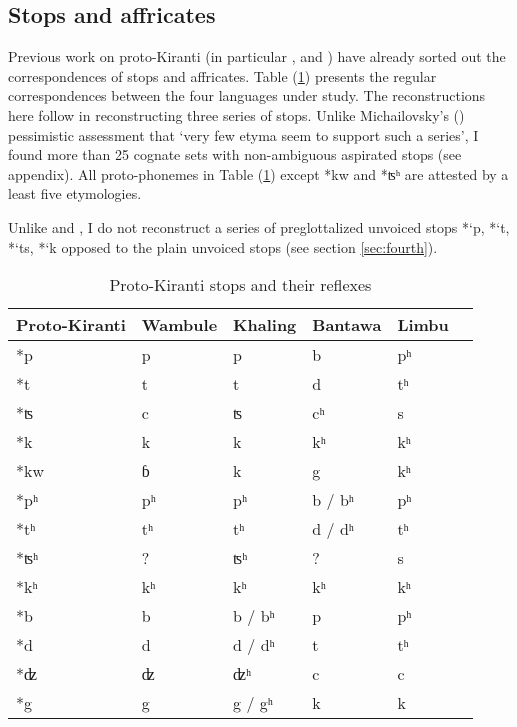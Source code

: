 \documentclass[oldfontcommands,oneside,a4paper,11pt]{article}
\newcommand{\ipa}[1]{{\phon\mbox{#1}}} %
\begin{document}
\subsection{Stops and affricates} \label{sec:stops}

Previous work on proto-Kiranti (in particular \citealt{starostin94kiranti}, \citealt{michailovsky94stops} and \citealt{opgenort05jero}) have already sorted out the correspondences of stops and affricates. Table (\ref{tab:stops}) presents the regular correspondences between the four languages under study. The reconstructions here follow \citet{michailovsky94stops} in reconstructing three series of stops. Unlike Michailovsky's (\citeyear{michailovsky10kiranti}) pessimistic assessment that `very  few etyma seem to support such a series', I found more than 25 cognate sets with non-ambiguous aspirated stops (see appendix). All proto-phonemes in Table (\ref{tab:stops}) except *\ipa{kw} and *\ipa{ʦʰ} are attested by a least five etymologies.

Unlike \citet{starostin94kiranti} and \citet{opgenort05jero}, I do not reconstruct a series of preglottalized unvoiced stops *\ipa{`p},  *\ipa{`t},  *\ipa{`ts},  *\ipa{`k} opposed to the plain unvoiced stops (see section \ref{sec:fourth}). 


\begin{table}[H]
\caption{Proto-Kiranti stops and their reflexes} \centering \label{tab:stops}
\begin{tabular}{llllll}
\toprule
Proto-Kiranti & Wambule & Khaling & Bantawa & Limbu \\
\midrule
\ipa{*p} & \ipa{p} & \ipa{p} & \ipa{b} & \ipa{pʰ}  \\
\ipa{*t} & \ipa{t} & \ipa{t} & \ipa{d} & \ipa{tʰ}  \\
\ipa{*ʦ} & \ipa{c} & \ipa{ʦ} & \ipa{cʰ} & \ipa{s}  \\
\ipa{*k} & \ipa{k} & \ipa{k} & \ipa{kʰ} & \ipa{kʰ}  \\
\midrule
\ipa{*kw} & \ipa{ɓ} & \ipa{k} & \ipa{g} & \ipa{kʰ}  \\
\midrule
\ipa{*pʰ} & \ipa{pʰ} & \ipa{pʰ} & \ipa{b} / \ipa{bʰ}  & \ipa{pʰ}  \\
\ipa{*tʰ} & \ipa{tʰ} & \ipa{tʰ} & \ipa{d} / \ipa{dʰ} & \ipa{tʰ}  \\
\ipa{*ʦʰ} & ? & \ipa{ʦʰ} & ? & \ipa{s}  \\
\ipa{*kʰ} & \ipa{kʰ} & \ipa{kʰ} & \ipa{kʰ} & \ipa{kʰ}  \\
\midrule
\ipa{*b} & \ipa{b} &\ipa{b} / \ipa{bʰ}  & \ipa{p} & \ipa{pʰ}  \\
\ipa{*d} & \ipa{d} & \ipa{d} / \ipa{dʰ}  & \ipa{t} & \ipa{tʰ}  \\
\ipa{*ʣ} & \ipa{ʣ} & \ipa{ʣʰ} & \ipa{c} & \ipa{c}  \\
\ipa{*g} & \ipa{g} & \ipa{g} / \ipa{gʰ}  & \ipa{k} & \ipa{k}  \\
\bottomrule
\end{tabular}
\end{table}
\end{document}
